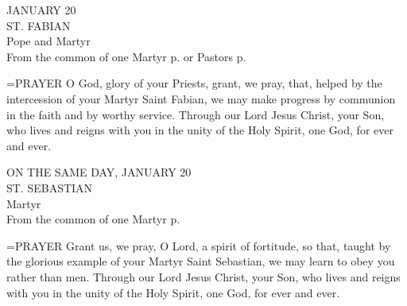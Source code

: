 \begin{center}\normalsize JANUARY 20\\
\footnotesize ST. FABIAN\\
\footnotesize Pope and Martyr\\
\footnotesize From the common of one Martyr p.    or Pastors p.  \\
\end{center}

\hangindent=\parindent \small{PRAYER 
O God, glory of your Priests,
grant, we pray,
that, helped by the intercession of your Martyr Saint Fabian,
we may make progress by communion in the faith
and by worthy service.
Through our Lord Jesus Christ, your Son,
who lives and reigns with you in the unity of the Holy Spirit,
one God, for ever and ever.\\}
 
\begin{center}\normalsize ON THE SAME DAY, JANUARY 20\\
\footnotesize ST. SEBASTIAN\\
\footnotesize Martyr\\
\footnotesize From the common of one Martyr p. \\
\end{center}

\hangindent=\parindent \small{PRAYER 
Grant us, we pray, O Lord, a spirit of fortitude,
so that, taught by the glorious example
of your Martyr Saint Sebastian,
we may learn to obey you rather than men.
Through our Lord Jesus Christ, your Son,
who lives and reigns with you in the unity of the Holy Spirit,
one God, for ever and ever.
 \\}
 
